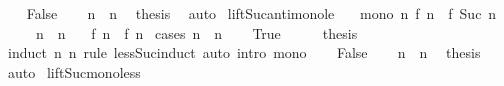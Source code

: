 \begin{isabellebody}
\isamarkupfalse%
\isanewline
\ \ \isamarkupfalse%
\ False\isanewline
\ \ \isamarkupfalse%
\ {\isacartoucheopen}n\ {\isasymle}\ n{\isacharprime}{\kern0pt}{\isacartoucheclose}\ \isamarkupfalse%
\ {\isacharquery}{\kern0pt}thesis\ \isamarkupfalse%
\ auto\isanewline
{}\isamarkupfalse%
%
\endisatagproof
{\isafoldproof}%
%
\isadelimproof
\isanewline
%
\endisadelimproof
\isanewline
{}\isamarkupfalse%
\ lift{\isacharunderscore}{\kern0pt}Suc{\isacharunderscore}{\kern0pt}antimono{\isacharunderscore}{\kern0pt}le{\isacharcolon}{\kern0pt}\isanewline
\ \ \ mono{\isacharcolon}{\kern0pt}\ {\isachardoublequoteopen}{\isasymAnd}n{\isachardot}{\kern0pt}\ f\ n\ {\isasymge}\ f\ {\isacharparenleft}{\kern0pt}Suc\ n{\isacharparenright}{\kern0pt}{\isachardoublequoteclose}\isanewline
\ \ \ \ \ {\isachardoublequoteopen}n\ {\isasymle}\ n{\isacharprime}{\kern0pt}{\isachardoublequoteclose}\isanewline
\ \ \ {\isachardoublequoteopen}f\ n\ {\isasymge}\ f\ n{\isacharprime}{\kern0pt}{\isachardoublequoteclose}\isanewline
%
\isadelimproof
%
\endisadelimproof
%
\isatagproof
{}\isamarkupfalse%
\ {\isacharparenleft}{\kern0pt}cases\ {\isachardoublequoteopen}n\ {\isacharless}{\kern0pt}\ n{\isacharprime}{\kern0pt}{\isachardoublequoteclose}{\isacharparenright}{\kern0pt}\isanewline
\ \ \isamarkupfalse%
\ True\isanewline
\ \ \isamarkupfalse%
\ \isamarkupfalse%
\ {\isacharquery}{\kern0pt}thesis\isanewline
\ \ \ \ \isamarkupfalse%
\ {\isacharparenleft}{\kern0pt}induct\ n\ n{\isacharprime}{\kern0pt}\ rule{\isacharcolon}{\kern0pt}\ less{\isacharunderscore}{\kern0pt}Suc{\isacharunderscore}{\kern0pt}induct{\isacharparenright}{\kern0pt}\ {\isacharparenleft}{\kern0pt}auto\ intro{\isacharcolon}{\kern0pt}\ mono{\isacharparenright}{\kern0pt}\isanewline
{}\isamarkupfalse%
\isanewline
\ \ \isamarkupfalse%
\ False\isanewline
\ \ \isamarkupfalse%
\ {\isacartoucheopen}n\ {\isasymle}\ n{\isacharprime}{\kern0pt}{\isacartoucheclose}\ \isamarkupfalse%
\ {\isacharquery}{\kern0pt}thesis\ \isamarkupfalse%
\ auto\isanewline
{}\isamarkupfalse%
%
\endisatagproof
{\isafoldproof}%
%
\isadelimproof
\isanewline
%
\endisadelimproof
\isanewline
{}\isamarkupfalse%
\ lift{\isacharunderscore}{\kern0pt}Suc{\isacharunderscore}{\kern0pt}mono{\isacharunderscore}{\kern0pt}less{\isacharcolon}{\kern0pt}\isanewline

\end{isabellebody}
